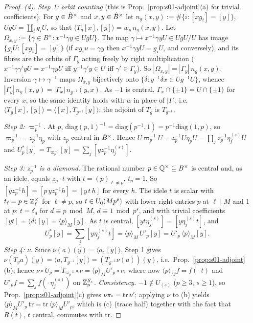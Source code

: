 \begin{proof}
\emph{(d).} \emph{Step 1: orbit counting} (this is Prop.~\ref{prop:s01-adjoint}(a) for trivial coefficients). For $g\in\hat{B}^\times$ and
$x,y\in\hat{B}^\times$ let $n_g(x,y):=\#\{i:[xg_i]=[y]\}$, $UgU=\coprod_ig_iU$, so that $\langle T_g[x],[y]\rangle=w_y\,n_g(x,y)$. Let
$\Omega_{x,y}:=\{\gamma\in B^\times:x^{-1}\gamma y\in UgU\}$. The map $\gamma\mapsto x^{-1}\gamma yU\in UgU/U$ has image
$\{g_iU:[xg_i]=[y]\}$ (if $xg_iu=\gamma y$ then $x^{-1}\gamma yU=g_iU$, and conversely), and its fibres are the orbits of
$\Gamma_y$ acting freely by right multiplication ($x^{-1}\gamma\gamma'yU=x^{-1}\gamma yU$ iff $y^{-1}\gamma'y\in U$ iff $\gamma'\in\Gamma_y$). So
$|\Omega_{x,y}|=|\Gamma_y|\,n_g(x,y)$. Inversion $\gamma\mapsto\gamma^{-1}$ maps $\Omega_{x,y}$ bijectively onto
$\{\delta:y^{-1}\delta x\in Ug^{-1}U\}$, whence $|\Gamma_y|\,n_g(x,y)=|\Gamma_x|\,n_{g^{-1}}(y,x)$. As $-1$ is central,
$\Gamma_x\cap\{\pm1\}=U\cap\{\pm1\}$ for every $x$, so the same identity holds with $w$ in place of $|\Gamma|$, i.e.
$\langle T_g[x],[y]\rangle=\langle[x],T_{g^{-1}}[y]\rangle$: the adjoint of $T_g$ is $T_{g^{-1}}$.

\emph{Step 2: $\varpi_p^{-1}$.} At $p$, $\mathrm{diag}(p,1)^{-1}=\mathrm{diag}(p^{-1},1)=p^{-1}\mathrm{diag}(1,p)$, so $\varpi_p^{-1}=z_p^{-1}\eta_p$
with $z_p$ central in $\hat{B}^\times$. Hence $U\varpi_p^{-1}U=z_p^{-1}U\eta_pU=\coprod_jz_p^{-1}\eta^{(s)}_jU$ and
$U_p^*[y]=T_{\varpi_p^{-1}}[y]=\sum_j[yz_p^{-1}\eta^{(s)}_j]$.

\emph{Step 3: $z_p^{-1}$ is a diamond.} The rational number $p\in\mathbb{Q}^\times\subseteq B^\times$ is central and, as an idele, equals
$z_p\cdot t$ with $t=(p)_{\ell\ne p}$, $t_p=1$. So $[yz_p^{-1}h]=[p\,yz_p^{-1}h]=[y\,t\,h]$ for every $h$. The idele $t$ is scalar with
$t_\ell=p\in\mathbb{Z}_\ell^\times$ for $\ell\ne p$, so $t\in U_0(Mp^s)$ with lower right entries $p$ at $\ell\mid M$ and $1$ at $p$:
$t=\delta_d$ for $d\equiv p\bmod M$, $d\equiv1\bmod p^s$, and with trivial coefficients $[yt]=\langle d\rangle[y]=\langle p\rangle_M[y]$.
As $t$ is central, $[yt\eta^{(s)}_j]=[y\eta^{(s)}_jt]$, and
\[U_p^*[y]=\sum_j[y\eta^{(s)}_jt]=\langle p\rangle_M\,U'_p[y]=U'_p\,\langle p\rangle_M[y].\]
\emph{Step 4: $\nu$.} Since $\nu(a)(y)=\langle a,[y]\rangle$, Step 1 gives
$\nu(T_ga)(y)=\langle a,T_{g^{-1}}[y]\rangle=(T_{g^{-1}}\nu(a))(y)$, i.e.\ Prop.~\ref{prop:s01-adjoint}(b); hence
$\nu\circ U_p=T_{\varpi_p^{-1}}\circ\nu=\langle p\rangle_MU'_p\circ\nu$, where now $\langle p\rangle_M f=f(\cdot\,t)$ and $U'_pf=\sum_jf(\cdot\,\eta^{(s)}_j)$
on $\mathbb{Z}_p^{S_s}$. \emph{Consistency.} $-1\notin U_{(s)}$ ($p\ge3$, $s\ge1$), so Prop.~\ref{prop:s01-adjoint}(c) gives $\nu\pi_*=\mathrm{tr}\,\nu'$;
applying $\nu$ to (b) yields $\langle p\rangle_MU'_p\,\mathrm{tr}=\mathrm{tr}\,\langle p\rangle_MU'_p$, which is (c) (trace half) together with
the fact that $R(t)$, $t$ central, commutes with $\mathrm{tr}$.


\end{proof}

